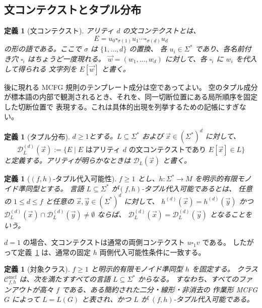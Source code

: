 \documentclass[11pt,a4paper]{ltjsarticle}
\newtheorem{definition}[theorem]{定義}
\theoremstyle{remark}
\newcommand{\Cmcf}[2]{\mathcal{C}^{\mathrm{mcf}}_{#1,#2}}
\newcommand{\D}{\mathcal{D}}
\newcommand{\tuple}[1]{\vec{#1}}
\newcommand{\blank}{\square}
\begin{document}
\subsection{文コンテクストとタプル分布}

\begin{definition}[文コンテクスト]
\label{def:sentence-context}
\emph{アリティ \(d\) の文コンテクスト}とは、
\[
  E=u_0\blank_{\sigma(1)}u_1\cdots\blank_{\sigma(d)}u_d
\]
の形の語である。ここで \(\sigma\) は \(\{1,\ldots,d\}\) の置換、
各 \(u_i\in\Sigma^*\) であり、各名前付き穴 \(\blank_i\) はちょうど一度現れる。
\(\tuple w=(w_1,\ldots,w_d)\) に対して、各 \(\blank_i\) に \(w_i\) を代入して得られる
文字列を \(E[\tuple w]\) と書く。
\end{definition}

後に現れる MCFG 規則のテンプレート成分は空であってよい。
空のタプル成分が標本語の内部で観測されるとき、それを、同一切断位置にある局所順序を固定した切断位置で
表現する。これは具体的出現を列挙するための記帳にすぎない。

\begin{definition}[タプル分布]
\label{def:tuple-distribution}
$d\geq1$とする。\(L\subseteq\Sigma^*\) および \(\tuple x\in(\Sigma^*)^d\) に対して、
\[
\D_L^{(d)}(\tuple x):=
\{E\mid E\text{ はアリティ }d\text{ の文コンテクストであり }E[\tuple x]\in L\}
\]
と定義する。アリティが明らかなときは \(\D_L(\tuple x)\) と書く。
\end{definition}

\begin{definition}[\((f,h)\)-タプル代入可能性]
\label{def:tuple-substitutable}
\(f\ge1\) とし、\(h\colon\Sigma^*\to M\) を明示的有限モノイド準同型とする。
言語 \(L\subseteq\Sigma^*\) が\emph{\((f,h)\)-タプル代入可能}であるとは、
任意の \(1\le d\le f\) と任意の
\(\tuple x,\tuple y\in(\Sigma^*)^d\) に対して、
\(h^{(d)}(\tuple x)=h^{(d)}(\tuple y)\) かつ
\(\D_L^{(d)}(\tuple x)\cap\D_L^{(d)}(\tuple y)\ne\emptyset\) ならば、
\(\D_L^{(d)}(\tuple x)=\D_L^{(d)}(\tuple y)\) となることをいう。
\end{definition}

\(d=1\) の場合、文コンテクストは通常の両側コンテクスト \(u\blank_1v\) である。
したがって定義~\ref{def:tuple-substitutable} は、通常の固定 \(h\) 両側代入可能性条件に一致する。

\begin{definition}[対象クラス]
\label{def:class-cmcf}
\(f\ge1\) と明示的有限モノイド準同型 \(h\) を固定する。
クラス \(\Cmcf{f}{h}\) は、次を満たすすべての言語 \(L\subseteq\Sigma^*\) からなる。
すなわち、すべてのファンアウトが高々 \(f\) である、ある簡約された二分・線形・非消去の
作業形 MCFG \(G\) によって \(L=L(G)\) と表され、かつ \(L\) が
\((f,h)\)-タプル代入可能である。
\end{definition}
\end{document}
